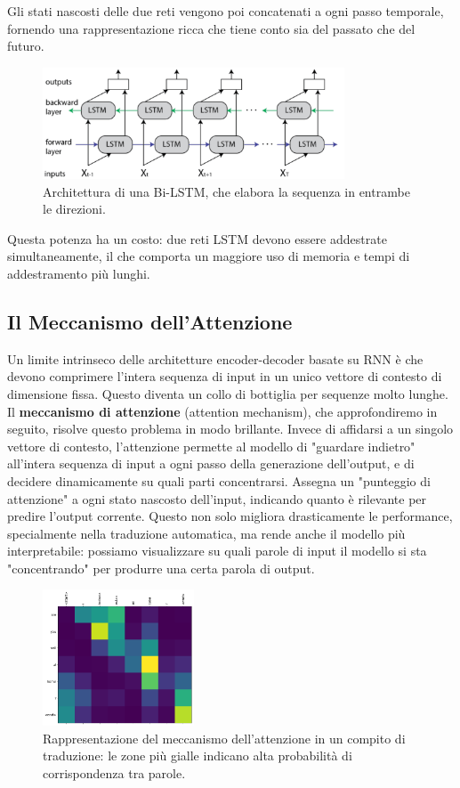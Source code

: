 Gli stati nascosti delle due reti vengono poi concatenati a ogni passo temporale, fornendo una rappresentazione ricca che tiene conto sia del passato che del futuro.
\begin{figure}
    \centering
    \includegraphics[width=0.8\textwidth]{figure/Bi-LSTM.png}
    \caption{Architettura di una Bi-LSTM, che elabora la sequenza in entrambe le direzioni.}
    \label{fig:bilstm}
\end{figure}
Questa potenza ha un costo: due reti LSTM devono essere addestrate simultaneamente, il che comporta un maggiore uso di memoria e tempi di addestramento più lunghi.

\subsection{Il Meccanismo dell'Attenzione}

Un limite intrinseco delle architetture encoder-decoder basate su RNN è che devono comprimere l'intera sequenza di input in un unico vettore di contesto di dimensione fissa. Questo diventa un collo di bottiglia per sequenze molto lunghe. Il \textbf{meccanismo di attenzione} (attention mechanism), che approfondiremo in seguito, risolve questo problema in modo brillante. Invece di affidarsi a un singolo vettore di contesto, l'attenzione permette al modello di "guardare indietro" all'intera sequenza di input a ogni passo della generazione dell'output, e di decidere dinamicamente su quali parti concentrarsi. Assegna un "punteggio di attenzione" a ogni stato nascosto dell'input, indicando quanto è rilevante per predire l'output corrente. Questo non solo migliora drasticamente le performance, specialmente nella traduzione automatica, ma rende anche il modello più interpretabile: possiamo visualizzare su quali parole di input il modello si sta "concentrando" per produrre una certa parola di output.

\begin{figure}
    \centering
    \includegraphics[width=0.40\textwidth]{figure/AttentionEx.png}
    \caption{Rappresentazione del meccanismo dell'attenzione in un compito di traduzione: le zone più gialle indicano alta probabilità di corrispondenza tra parole.}
    \label{fig:AttEx}
\end{figure}

